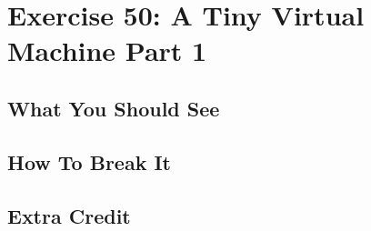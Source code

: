 \chapter{Exercise 50: A Tiny Virtual Machine Part 1}


\section{What You Should See}


\section{How To Break It}


\section{Extra Credit}



